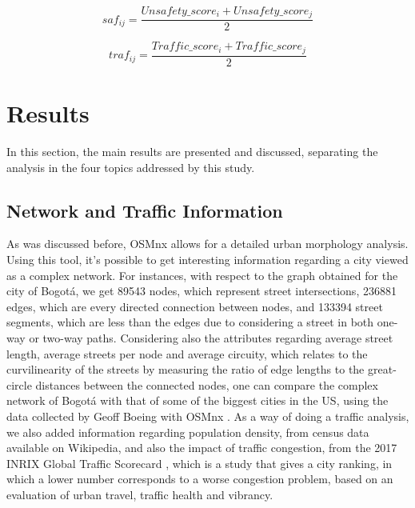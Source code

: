 \documentclass[runningheads]{llncs}
\begin{document}
$$saf_{ij} = \frac{Unsafety\_score_{i} + Unsafety\_score_{j}}{2}$$ 

$$traf_{ij} = \frac{Traffic\_score_{i} + Traffic\_score_{j}}{2}$$


\section{Results}

In this section, the main results are presented and discussed, separating the analysis in the four topics addressed by this study.

\subsection{Network and Traffic Information}

As was discussed before, OSMnx \cite{geoff_osmnx:_2017} allows for a detailed urban morphology analysis. Using this tool, it's possible to get interesting information regarding a city viewed as a complex network. For instances, with respect to the graph obtained for the city of Bogotá, we get 89543 nodes, which represent street intersections, 236881 edges, which are every directed connection between nodes, and 133394 street segments, which are less than the edges due to considering a street in both one-way or two-way paths. Considering also the attributes regarding average street length, average streets per node and average circuity, which relates to the curvilinearity of the streets by measuring the ratio of edge lengths to the great-circle distances between the connected nodes, one can compare the complex network of Bogotá with that of some of the biggest cities in the US, using the data collected by Geoff Boeing with OSMnx \cite{boeing_multi-scale_2018}. As a way of doing a traffic analysis, we also added information regarding population density, from census data available on Wikipedia, and also the impact of traffic congestion, from the 2017 INRIX Global Traffic Scorecard \cite{noauthor_inrix_2017}, which is a study that gives a city ranking, in which a lower number corresponds to a worse congestion problem, based on an evaluation of urban travel, traffic health and vibrancy.
\end{document}
